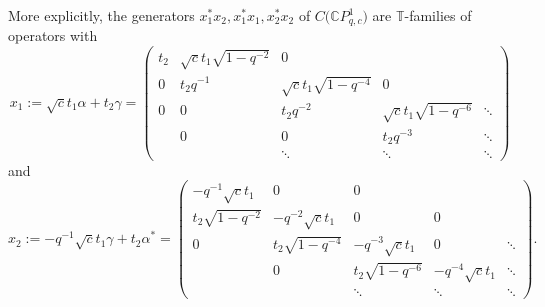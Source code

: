 More explicitly, the generators $x_{1}^{\ast}x_{2},x_{1}^{\ast}x_{1},x_{2}^{\ast}x_{2}$ of $C\big( \mathbb{C}P_{q,c}^{1}\big) $ are
$\mathbb{T}$-families of operators with
\[
x_{1}:=\sqrt{c}t_{1}\alpha+t_{2}\gamma=\left(
\begin{matrix}
t_{2} & \sqrt{c}t_{1}\sqrt{1-q^{-2}} & 0 & & \\
0 & t_{2}q^{-1} & \sqrt{c}t_{1}\sqrt{1-q^{-4}} & 0 & \\
0 & 0 & t_{2}q^{-2} & \sqrt{c}t_{1}\sqrt{1-q^{-6}} & \ddots\\
& 0 & 0 & t_{2}q^{-3} & \ddots\\
& & \ddots & \ddots & \ddots
\end{matrix}
\right)
\]
and
\[
x_{2}:=-q^{-1}\sqrt{c}t_{1}\gamma+t_{2}\alpha^{\ast}=\left(
\begin{matrix}
-q^{-1}\sqrt{c}t_{1} & 0 & 0 & & \\
t_{2}\sqrt{1-q^{-2}} & -q^{-2}\sqrt{c}t_{1} & 0 & 0 & \\
0 & t_{2}\sqrt{1-q^{-4}} & -q^{-3}\sqrt{c}t_{1} & 0 & \ddots\\
& 0 & t_{2}\sqrt{1-q^{-6}} & -q^{-4}\sqrt{c}t_{1} & \ddots\\
& & \ddots & \ddots & \ddots
\end{matrix}
\right) .
\]

